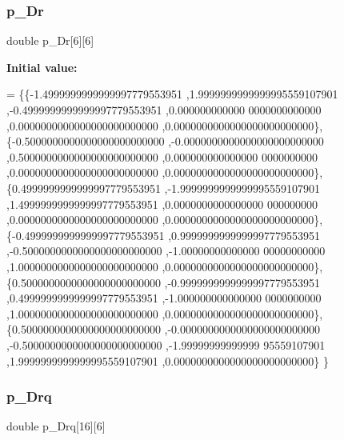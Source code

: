 \subsubsection{\texorpdfstring{p\+\_\+\+Dr}{p\_Dr}}
{\footnotesize\ttfamily double p\+\_\+\+Dr\mbox{[}6\mbox{]}\mbox{[}6\mbox{]}}

{\bfseries Initial value\+:}
\begin{DoxyCode}
= \{\{-1.4999999999999997779553951 ,1.9999999999999995559107901 ,-0.4999999999999997779553951 ,0.000000000000
      0000000000000 ,0.0000000000000000000000000 ,0.0000000000000000000000000\},
\{-0.5000000000000000000000000 ,-0.0000000000000000000000000 ,0.5000000000000000000000000 ,0.000000000000000
      0000000000 ,0.0000000000000000000000000 ,0.0000000000000000000000000\},
\{0.4999999999999997779553951 ,-1.9999999999999995559107901 ,1.4999999999999997779553951 ,0.0000000000000000
      000000000 ,0.0000000000000000000000000 ,0.0000000000000000000000000\},
\{-0.4999999999999997779553951 ,0.9999999999999997779553951 ,-0.5000000000000000000000000 ,-1.00000000000000
      00000000000 ,1.0000000000000000000000000 ,0.0000000000000000000000000\},
\{0.5000000000000000000000000 ,-0.9999999999999997779553951 ,0.4999999999999997779553951 ,-1.000000000000000
      0000000000 ,1.0000000000000000000000000 ,0.0000000000000000000000000\},
\{0.5000000000000000000000000 ,-0.0000000000000000000000000 ,-0.5000000000000000000000000 ,-1.99999999999999
      95559107901 ,1.9999999999999995559107901 ,0.0000000000000000000000000\}
\}
\end{DoxyCode}
\mbox{\label{a00990_ad05a6edc0f688daf226a365e293ad715}} 
\subsubsection{\texorpdfstring{p\+\_\+\+Drq}{p\_Drq}}
{\footnotesize\ttfamily double p\+\_\+\+Drq\mbox{[}16\mbox{]}\mbox{[}6\mbox{]}}

